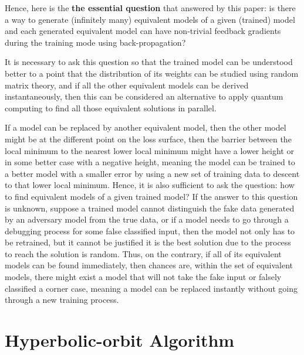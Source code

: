 \documentclass{article}
\theoremstyle{plain}
\theoremstyle{plain} %
\theoremstyle{definition}  %
\theoremstyle{remark}  %
\theoremstyle{plain}
\begin{document}
Hence, here is the \textbf{the essential question} that answered by this paper: is there a way to generate (infinitely many) equivalent models of a given (trained) model and each generated equivalent model can have non-trivial feedback gradients during the training mode using back-propagation?


It is necessary to ask this question so that the trained model can be understood better to a point that the distribution of its weights can be studied using random matrix theory, and if all the other equivalent models can be derived instantaneously, then this can be considered an alternative to apply quantum computing to find all those equivalent solutions in parallel.

If a model can be replaced by another equivalent model, then the other model might be at the different point on the loss surface, then the barrier between the local minimum to the nearest lower local minimum might have a lower height or in some better case with a negative height, meaning the model can be trained to a better model with a smaller error by using a new set of training data to descent to that lower local minimum. Hence, it is also sufficient to ask the question: how to find equivalent models of a given trained model? If the answer to this question is unknown, suppose a trained model cannot distinguish the fake data generated by an adversary model from the true data, or if a model needs to go through a debugging process for some false classified input, then the model not only has to be retrained, but it cannot be justified it is the best solution due to the process to reach the solution is random. Thus, on the contrary, if all of its equivalent models can be found immediately, then chances are, within the set of equivalent models, there might exist a model that will not take the fake input or falsely classified a corner case, meaning a model can be replaced instantly without going through a new training process.


\section{Hyperbolic-orbit Algorithm}

\end{document}
